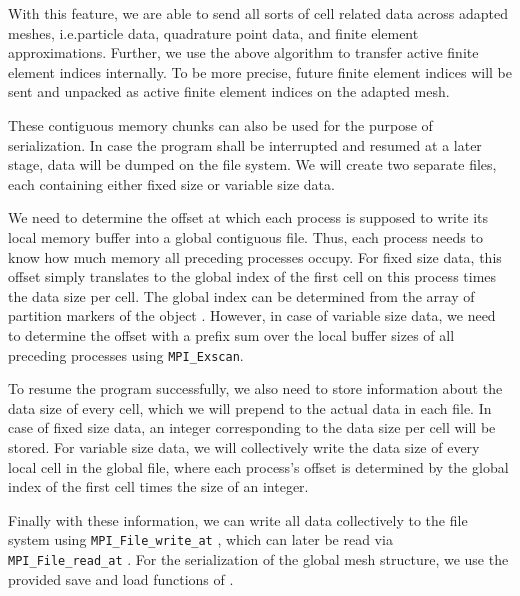 

With this feature, we are able to send all sorts of cell related data across adapted meshes, i.e.\@ particle data, quadrature point data, and finite element approximations. Further, we use the above algorithm to transfer active finite element indices internally. To be more precise, future finite element indices will be sent and unpacked as active finite element indices on the adapted mesh.

These contiguous memory chunks can also be used for the purpose of serialization. In case the program shall be interrupted and resumed at a later stage, data will be dumped on the file system. We will create two separate files, each containing either fixed size or variable size data.

We need to determine the offset at which each process is supposed to write its local memory buffer into a global contiguous file. Thus, each process needs to know how much memory all preceding processes occupy. For fixed size data, this offset simply translates to the global index of the first cell on this process times the data size per cell. The global index can be determined from the array of partition markers of the \pforest{} object \parencite{burstedde2018}. However, in case of variable size data, we need to determine the offset with a prefix sum over the local buffer sizes of all preceding processes using \texttt{MPI\_Exscan}.


To resume the program successfully, we also need to store information about the data size of every cell, which we will prepend to the actual data in each file. In case of fixed size data, an integer corresponding to the data size per cell will be stored. For variable size data, we will collectively write the data size of every local cell in the global file, where each process's offset is determined by the global index of the first cell times the size of an integer.

Finally with these information, we can write all data collectively to the file system using \texttt{MPI\_File\_write\_at} \textcite{mpi31}, which can later be read via \texttt{MPI\_File\_read\_at} \textcite{mpi31}. For the serialization of the global mesh structure, we use the provided save and load functions of \pforest{}.

